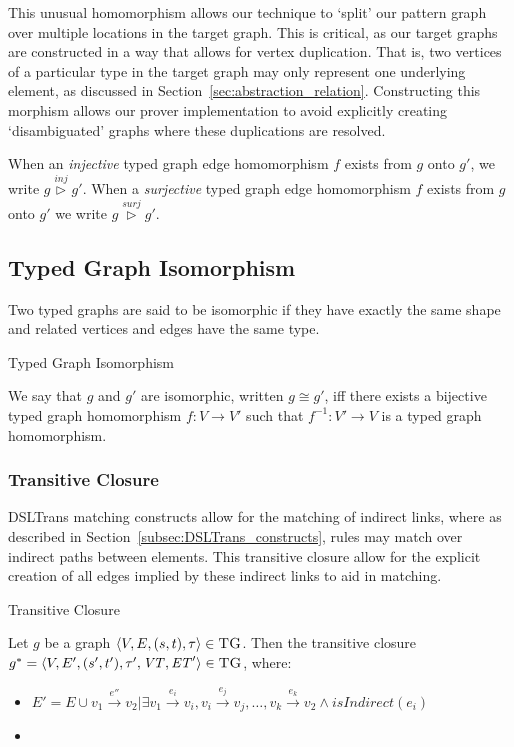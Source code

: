 This unusual homomorphism allows our technique to `split' our pattern graph over multiple locations in the target graph. This is critical, as our target graphs are constructed in a way that allows for vertex duplication. That is, two vertices of a particular type in the target graph may only represent one underlying element, as discussed in Section~\ref{sec:abstraction_relation}. Constructing this morphism allows our prover implementation to avoid explicitly creating `disambiguated' graphs where these duplications are resolved.

 When an \emph{injective} typed graph edge homomorphism $f$ exists from $g$ onto $g'$, we write $g \stackrel{inj}{\vartriangleright} g'$. When a \emph{surjective} typed graph edge homomorphism $f$ exists from $g$ onto $g'$ we write $g \stackrel{surj}{\vartriangleright} g'$.



\subsection*{Typed Graph Isomorphism}
Two typed graphs are said to be isomorphic if they have exactly the same shape and related vertices and edges have the same type.


\begin{definition}{Typed Graph Isomorphism\\}
\label{def:typed_graph_isomorphism}

We say that $g$ and $g'$ are isomorphic, written $g\cong g'$, iff there exists a bijective typed graph homomorphism $f:V\rightarrow V'$ such that $f^{-1}:V'\rightarrow V$ is a typed graph homomorphism.
\end{definition}




\subsubsection*{Transitive Closure}

DSLTrans matching constructs allow for the matching of indirect links, where as described in Section~\ref{subsec:DSLTrans_constructs}, rules may match over indirect paths between elements. This transitive closure allow for the explicit creation of all edges implied by these indirect links to aid in matching.


\begin{definition}{Transitive Closure\\}
\label{def:instance_closure}

Let $g$ be a graph $\langle V,E,(s, t),\tau\rangle \in \textsc{TG}$. Then the transitive closure $g^{*} = \langle V,E',(s', t'),\tau', \mathit{VT}, \mathit{ET}' \rangle \in \textsc{TG}$, where:

\begin{itemize}
\item $E' = E \cup v_1\xrightarrow{e''}v_2 | \exists v_1\xrightarrow{e_i}v_i, v_i\xrightarrow{e_j}v_j, \dots, v_k\xrightarrow{e_k}v_2 \land \mathit{isIndirect(e_i)}$
\item {}
\end{itemize}
\end{definition}


